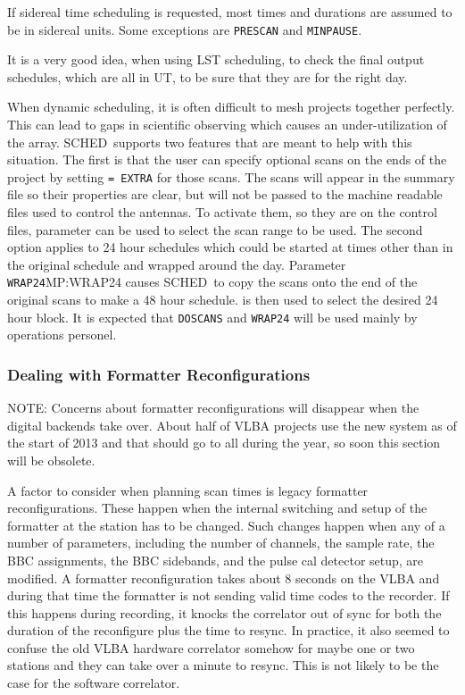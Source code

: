 \documentclass{report}
\newcommand{\schedb}{{\sc SCHED~}}
\begin{document}
If sidereal time scheduling is requested, most times and durations are
assumed to be in sidereal units.  Some exceptions are {\tt PRESCAN} and
{\tt MINPAUSE}.

It is a very good idea, when using LST scheduling, to check the
final output schedules, which are all in UT, to be sure that they
are for the right day.

When dynamic scheduling, it is often difficult to mesh projects
together perfectly.  This can lead to gaps in scientific observing
which causes an under-utilization of the array.  \schedb supports two
features that are meant to help with this situation.  The first is
that the user can specify optional scans on the ends of the project by
setting  {\tt = EXTRA} for those
scans.  The scans will appear in the summary file so their properties
are clear, but will not be passed to the machine readable files used
to control the antennas.  To activate them, so they are on the control
files, parameter  can be used to
select the scan range to be used.  The second option applies to 24
hour schedules which could be started at times other than in the
original schedule and wrapped around the day.  Parameter \htmlref
{{\tt WRAP24}}{MP:WRAP24} causes \schedb to copy the scans onto the
end of the original scans to make a 48 hour schedule.   is then used to select the desired 24 hour
block.  It is expected that {\tt DOSCANS} and {\tt WRAP24} will be
used mainly by operations personel.


\subsubsection{\label{SSSEC:Reconfigurations}Dealing with Formatter
Reconfigurations}

NOTE: Concerns about formatter reconfigurations will disappear when
the digital backends take over.  About half of VLBA projects use the
new system as of the start of 2013 and that should go to all during
the year, so soon this section will be obsolete.

A factor to consider when planning scan times is legacy formatter
reconfigurations.  These happen when the internal switching and setup
of the formatter at the station has to be changed.  Such changes
happen when any of a number of parameters, including the number of
channels, the sample rate, the BBC assignments, the BBC sidebands, and
the pulse cal detector setup, are modified.  A formatter
reconfiguration takes about 8 seconds on the VLBA and during that time
the formatter is not sending valid time codes to the recorder.  If
this happens during recording, it knocks the correlator out of sync
for both the duration of the reconfigure plus the time to resync.  In
practice, it also seemed to confuse the old VLBA hardware correlator
somehow for maybe one or two stations and they can take over a minute
to resync.  This is not likely to be the case for the software
correlator.
\end{document}

